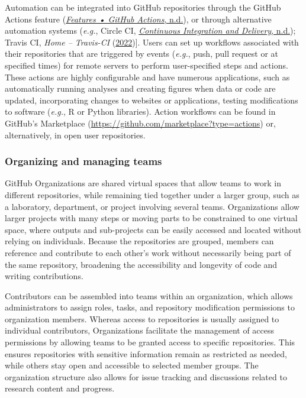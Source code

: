 Automation can be integrated into GitHub repositories through the GitHub Actions feature (\protect\hyperlink{ref-NUXbp429}{\emph{Features • GitHub Actions}, n.d.}), or through alternative automation systems (\emph{e.g.}, Circle CI, \protect\hyperlink{ref-T03Api6e}{\emph{Continuous Integration and Delivery}, n.d.}); Travis CI, \emph{Home -- Travis-CI} (\protect\hyperlink{ref-YeFSbfFV}{2022}){]}.
Users can set up workflows associated with their repositories that are triggered by events (\emph{e.g.}, push, pull request or at specified times) for remote servers to perform user-specified steps and actions.
These actions are highly configurable and have numerous applications, such as automatically running analyses and creating figures when data or code are updated, incorporating changes to websites or applications, testing modifications to software (\emph{e.g.}, R or Python libraries).
Action workflows can be found in GitHub's Marketplace (\url{https://github.com/marketplace?type=actions}) or, alternatively, in open user repositories.

\hypertarget{organizations}{%
\subsubsection{Organizing and managing teams}\label{organizations}}

GitHub Organizations are shared virtual spaces that allow teams to work in different repositories, while remaining tied together under a larger group, such as a laboratory, department, or project involving several teams.
Organizations allow larger projects with many steps or moving parts to be constrained to one virtual space, where outputs and sub-projects can be easily accessed and located without relying on individuals.
Because the repositories are grouped, members can reference and contribute to each other's work without necessarily being part of the same repository, broadening the accessibility and longevity of code and writing contributions.

Contributors can be assembled into teams within an organization, which allows administrators to assign roles, tasks, and repository modification permissions to organization members.
Whereas access to repositories is usually assigned to individual contributors, Organizations facilitate the management of access permissions by allowing teams to be granted access to specific repositories.
This ensures repositories with sensitive information remain as restricted as needed, while others stay open and accessible to selected member groups.
The organization structure also allows for issue tracking and discussions related to research content and progress.

